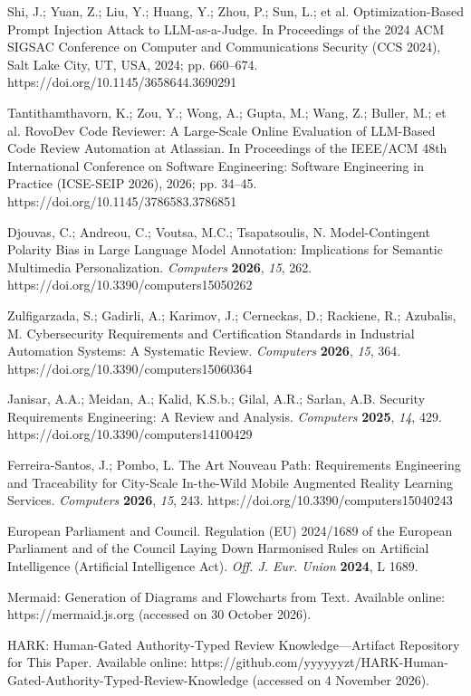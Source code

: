 Shi, J.; Yuan, Z.; Liu, Y.; Huang, Y.; Zhou, P.; Sun, L.; et al. Optimization-Based Prompt Injection Attack to LLM-as-a-Judge. In Proceedings of the 2024 ACM SIGSAC Conference on Computer and Communications Security (CCS 2024), Salt Lake City, UT, USA, 2024; pp. 660--674. https://doi.org/10.1145/3658644.3690291

Tantithamthavorn, K.; Zou, Y.; Wong, A.; Gupta, M.; Wang, Z.; Buller, M.; et al. RovoDev Code Reviewer: A Large-Scale Online Evaluation of LLM-Based Code Review Automation at Atlassian. In Proceedings of the IEEE/ACM 48th International Conference on Software Engineering: Software Engineering in Practice (ICSE-SEIP 2026), 2026; pp. 34--45. https://doi.org/10.1145/3786583.3786851

Djouvas, C.; Andreou, C.; Voutsa, M.C.; Tsapatsoulis, N. Model-Contingent Polarity Bias in Large Language Model Annotation: Implications for Semantic Multimedia Personalization. {\em Computers} {\bf 2026}, {\em 15}, 262. https://doi.org/10.3390/computers15050262

Zulfigarzada, S.; Gadirli, A.; Karimov, J.; Cerneckas, D.; Rackiene, R.; Azubalis, M. Cybersecurity Requirements and Certification Standards in Industrial Automation Systems: A Systematic Review. {\em Computers} {\bf 2026}, {\em 15}, 364. https://doi.org/10.3390/computers15060364

Janisar, A.A.; Meidan, A.; Kalid, K.S.b.; Gilal, A.R.; Sarlan, A.B. Security Requirements Engineering: A Review and Analysis. {\em Computers} {\bf 2025}, {\em 14}, 429. https://doi.org/10.3390/computers14100429

Ferreira-Santos, J.; Pombo, L. The Art Nouveau Path: Requirements Engineering and Traceability for City-Scale In-the-Wild Mobile Augmented Reality Learning Services. {\em Computers} {\bf 2026}, {\em 15}, 243. https://doi.org/10.3390/computers15040243

European Parliament and Council. Regulation (EU) 2024/1689 of the European Parliament and of the Council Laying Down Harmonised Rules on Artificial Intelligence (Artificial Intelligence Act). {\em Off. J. Eur. Union} {\bf 2024}, L 1689.

Mermaid: Generation of Diagrams and Flowcharts from Text. Available online: https://mermaid.js.org (accessed on 30 October 2026).

HARK: Human-Gated Authority-Typed Review Knowledge---Artifact Repository for This Paper. Available online: https://github.com/yyyyyyzt/HARK-Human-Gated-Authority-Typed-Review-Knowledge (accessed on 4 November 2026).
